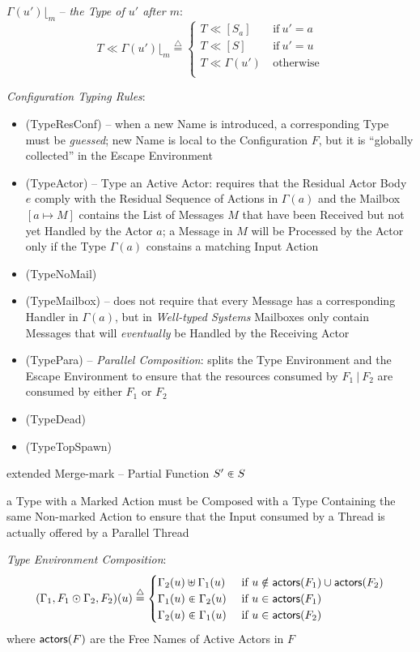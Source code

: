 $\Gamma(u')\lfloor_m$ -- \emph{the Type of $u'$ after $m$}:
\[
  T \ll \Gamma(u')\lfloor_m \overset{\triangle}{=}
  \begin{cases}
    T \ll [S_a]      &\ \text{if}\ u' = a \\
    T \ll [S]        &\ \text{if}\ u' = u \\
    T \ll \Gamma(u') &\ \text{otherwise} \\
  \end{cases}
\]

\emph{Configuration Typing Rules}:
\begin{itemize}
  \item (TypeResConf) -- when a new Name is introduced, a
    corresponding Type must be \emph{guessed}; new Name is local to
    the Configuration $F$, but it is ``globally collected'' in the
    Escape Environment %
  \item (TypeActor) -- Type an Active Actor: requires that the
    Residual Actor Body $e$ comply with the Residual Sequence of
    Actions in $\Gamma(a)$ and the Mailbox $[a \mapsto M]$ contains
    the List of Messages $M$ that have been Received but not yet
    Handled by the Actor $a$; a Message in $M$ will be Processed by
    the Actor only if the Type $\Gamma(a)$ constains a matching Input
    Action
  \item (TypeNoMail)
  \item (TypeMailbox) -- does not require that every Message has a
    corresponding Handler in $\Gamma(a)$, but in \emph{Well-typed
      Systems} Mailboxes only contain Messages that will
    \emph{eventually} be Handled by the Receiving Actor
  \item (TypePara) -- \emph{Parallel Composition}: splits the Type
    Environment and the Escape Environment to ensure that the
    resources consumed by $F_1 \ |\ F_2$ are consumed by either $F_1$
    or $F_2$
  \item (TypeDead)
  \item (TypeTopSpawn)
\end{itemize}

extended Merge-mark -- Partial Function $S' \inplus S$

a Type with a Marked Action must be Composed with a Type Containing
the same Non-marked Action to ensure that the Input consumed by a
Thread is actually offered by a Parallel Thread

\emph{Type Environment Composition}:
\[
  (\Gamma_1,F_1 \odot \Gamma_2,F_2)(u) \overset{\triangle}{=}
    \begin{cases}
      \Gamma_2(u) \uplus \Gamma_1(u)
        &\ \text{if}\ u \notin \mathsf{actors}(F_1) \cup \mathsf{actors}(F_2) \\
      \Gamma_1(u) \inplus \Gamma_2(u)
        &\ \text{if}\ u \in \mathsf{actors}(F_1) \\
      \Gamma_2(u) \inplus \Gamma_1(u)
        &\ \text{if}\ u \in \mathsf{actors}(F_2) \\
    \end{cases}
\]
where $\mathsf{actors}(F)$ are the Free Names of Active Actors in $F$



